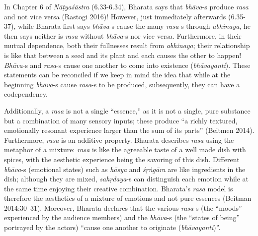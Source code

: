In Chapter 6 of \textsl{Nāṭyaśāstra} (6.33-6.34), Bharata
 says that \hbox{\textsl{bhāva}-s} produce \textsl{rasa} and not vice versa (Rastogi 2016)! However, just immediately afterwards (6.35-37), while Bharata first says \hbox{\textsl{bhāva}-s} cause the many \textsl{rasa}-s through \textsl{abhinaya}, he then says neither is \textsl{rasa} without \textsl{bhāva}-s nor vice versa. Furthermore, in their mutual dependence, both their fullnesses result from \textsl{abhinaya}; their relationship is like that between a seed and its plant and each causes the other to happen! \textsl{Bhāva}-s and \textsl{rasa}-s cause one another to come into existence (\textsl{bhāvayanti}). These statements can be reconciled if we keep in mind the idea that while at the beginning \textsl{bhāva}-s cause \textsl{rasa}-s to be produced, subsequently, they can have a codependency.

Additionally, a \textsl{rasa} is not a single “essence,” as it is not a single, pure substance but a combination of many sensory inputs; these produce “a richly textured, emotionally resonant experience larger than the sum of its parts” (Beitmen 2014). Furthermore, \textsl{rasa} is an additive property. Bharata describes \textsl{rasa} using the metaphor of a mixture: \textsl{rasa} is like the agreeable taste of a well made dish with spices, with the aesthetic experience being the savoring of this dish. Different \textsl{bhāva}-s (emotional states) such as \textsl{hāsya} and \textsl{śṛṅgāra} are like ingredients in the dish; although they are mixed, \textsl{sahṛdaya}-s can distinguish each emotion while at the same time enjoying their creative combination. Bharata’s \textsl{rasa} model is therefore the aesthetics of a mixture of emotions and not pure essences (Beitman 2014:30--31). Moreover, Bharata declares that the various \textsl{rasa}-s (the “moods” experienced by the audience members) and the \textsl{bhāva}-s (the “states of being” portrayed by the actors) “cause one another to originate (\textsl{bhāvayanti})”. 

